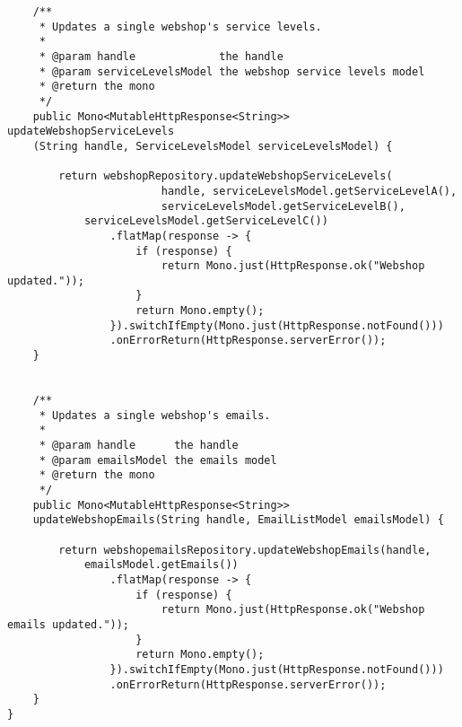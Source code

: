 \begin{verbatim}
	/**
	 * Updates a single webshop's service levels.
	 *
	 * @param handle             the handle
	 * @param serviceLevelsModel the webshop service levels model
	 * @return the mono
	 */
	public Mono<MutableHttpResponse<String>> updateWebshopServiceLevels
	(String handle, ServiceLevelsModel serviceLevelsModel) {

		return webshopRepository.updateWebshopServiceLevels(
						handle, serviceLevelsModel.getServiceLevelA(),
						serviceLevelsModel.getServiceLevelB(),
            serviceLevelsModel.getServiceLevelC())
				.flatMap(response -> {
					if (response) {
						return Mono.just(HttpResponse.ok("Webshop updated."));
					}
					return Mono.empty();
				}).switchIfEmpty(Mono.just(HttpResponse.notFound()))
				.onErrorReturn(HttpResponse.serverError());
	}


	/**
	 * Updates a single webshop's emails.
	 *
	 * @param handle      the handle
	 * @param emailsModel the emails model
	 * @return the mono
	 */
	public Mono<MutableHttpResponse<String>>
    updateWebshopEmails(String handle, EmailListModel emailsModel) {

		return webshopemailsRepository.updateWebshopEmails(handle,
			emailsModel.getEmails())
				.flatMap(response -> {
					if (response) {
						return Mono.just(HttpResponse.ok("Webshop emails updated."));
					}
					return Mono.empty();
				}).switchIfEmpty(Mono.just(HttpResponse.notFound()))
				.onErrorReturn(HttpResponse.serverError());
	}
}
\end{verbatim}
